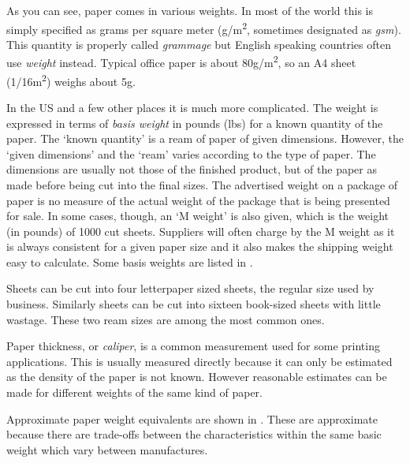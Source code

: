 \documentclass[10pt,a4paper,oneside,extrafontsizes]{memoir}%
\newcommand*{\sqrd}[1]{#1\textsuperscript{2}}
\newcommand*{\gsm}{g/\sqrd{m}}
\newcommand*{\half}{\slashfrac{1}{2}}
\begin{document}
\begin{paracol}{2}
\switchEng
    As you can see, paper comes in various weights. In most of the world this
is simply specified as grams per square meter (\gsm, sometimes designated as
\emph{gsm}). This quantity is properly called \emph{grammage}
but English
speaking countries often use \emph{weight} instead. Typical office
paper is about 80\gsm, so an A4 sheet (1/16\sqrd{m}) weighs about 5g.

    In the US and a few other places it is much more complicated. The
weight is expressed in terms of \emph{basis weight} 
in pounds (lbs) for a known quantity of the
paper. The `known quantity' is a ream of paper of given dimensions. However, 
the `given dimensions' and the `ream' varies according to the type of paper.
The dimensions are usually not those of the finished product, but of the paper
as made before being cut into the final sizes. 
The advertised weight on a package of paper is no measure of the actual 
weight of the package that is being presented for sale. 
In some cases, though, an `M weight' is also given, 
which is the weight (in
pounds) of 1000 cut sheets. Suppliers will often charge by the M weight as it
is always consistent for a given paper size and it also makes the shipping
weight easy to calculate. Some basis weights
are listed in .


    
    Sheets  can be cut into four \abybm{8\,\half}{11}{in}
letterpaper sized sheets, the regular size used by business. 
Similarly sheets  can be cut into sixteen
 book-sized sheets with little wastage. These two ream sizes
are among the most common ones.

    Paper thickness, or \emph{caliper}, is a common measurement
used for some printing applications. This is usually measured directly
because it can only be estimated as the density of the paper is not known.
However reasonable estimates can be made for different weights of
the same kind of paper.

    Approximate paper weight equivalents are shown in .
These are approximate because there are trade-offs between the characteristics
within the same basic weight which vary between manufactures.
\end{paracol}



\end{document}
